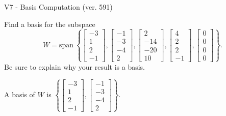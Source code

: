 \begin{exercise}
  \begin{exerciseTitle}V7 - Basis Computation (ver. 591)\end{exerciseTitle}
  \begin{exerciseStatement}
    Find a basis for the subspace 
\[W=\mathrm{span}\ \left\{\left[\begin{array}{r}
-3 \\
1 \\
2 \\
-1
\end{array}\right] , \left[\begin{array}{r}
-1 \\
-3 \\
-4 \\
2
\end{array}\right] , \left[\begin{array}{r}
2 \\
-14 \\
-20 \\
10
\end{array}\right] , \left[\begin{array}{r}
4 \\
2 \\
2 \\
-1
\end{array}\right] , \left[\begin{array}{r}
0 \\
0 \\
0 \\
0
\end{array}\right]\right\}.\]
 Be sure to explain why your result is a basis.


  \end{exerciseStatement}
  \begin{exerciseAnswer}
   A basis of \(W\) is  \(\left\{\left[\begin{array}{r}
-3 \\
1 \\
2 \\
-1
\end{array}\right] , \left[\begin{array}{r}
-1 \\
-3 \\
-4 \\
2
\end{array}\right]\right\}\).
  


  \end{exerciseAnswer}
\end{exercise}